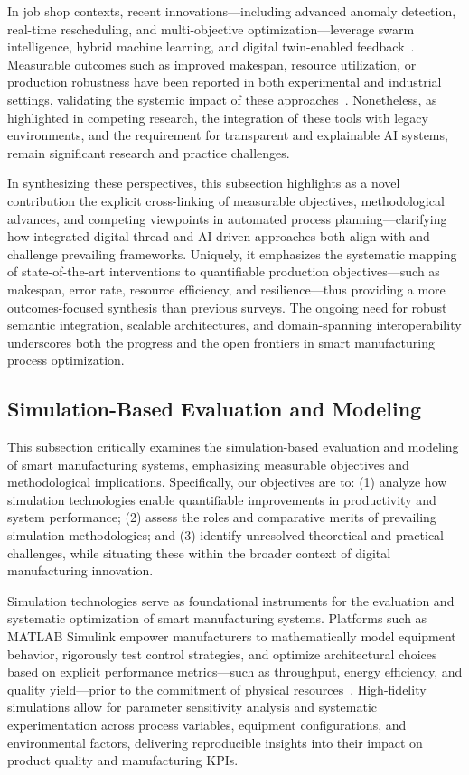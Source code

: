\documentclass[sigconf]{acmart}
\begin{document}
In job shop contexts, recent innovations—including advanced anomaly detection, real-time rescheduling, and multi-objective optimization—leverage swarm intelligence, hybrid machine learning, and digital twin-enabled feedback~\cite{ref19,ref27,ref38,ref44,ref45,ref59}. Measurable outcomes such as improved makespan, resource utilization, or production robustness have been reported in both experimental and industrial settings, validating the systemic impact of these approaches~\cite{ref15,ref19,ref59}. Nonetheless, as highlighted in competing research, the integration of these tools with legacy environments, and the requirement for transparent and explainable AI systems, remain significant research and practice challenges.

In synthesizing these perspectives, this subsection highlights as a novel contribution the explicit cross-linking of measurable objectives, methodological advances, and competing viewpoints in automated process planning—clarifying how integrated digital-thread and AI-driven approaches both align with and challenge prevailing frameworks. Uniquely, it emphasizes the systematic mapping of state-of-the-art interventions to quantifiable production objectives—such as makespan, error rate, resource efficiency, and resilience—thus providing a more outcomes-focused synthesis than previous surveys. The ongoing need for robust semantic integration, scalable architectures, and domain-spanning interoperability underscores both the progress and the open frontiers in smart manufacturing process optimization.

\subsection{Simulation-Based Evaluation and Modeling}

This subsection critically examines the simulation-based evaluation and modeling of smart manufacturing systems, emphasizing measurable objectives and methodological implications. Specifically, our objectives are to: (1) analyze how simulation technologies enable quantifiable improvements in productivity and system performance; (2) assess the roles and comparative merits of prevailing simulation methodologies; and (3) identify unresolved theoretical and practical challenges, while situating these within the broader context of digital manufacturing innovation.

Simulation technologies serve as foundational instruments for the evaluation and systematic optimization of smart manufacturing systems. Platforms such as MATLAB Simulink empower manufacturers to mathematically model equipment behavior, rigorously test control strategies, and optimize architectural choices based on explicit performance metrics---such as throughput, energy efficiency, and quality yield---prior to the commitment of physical resources~\cite{ref95}. High-fidelity simulations allow for parameter sensitivity analysis and systematic experimentation across process variables, equipment configurations, and environmental factors, delivering reproducible insights into their impact on product quality and manufacturing KPIs.
\end{document}
